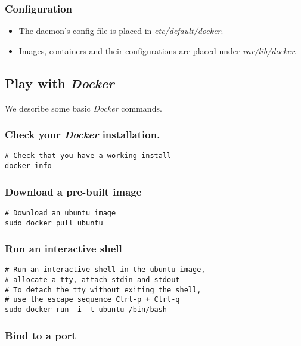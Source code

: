 \documentclass[11pt]{article}
\begin{document}
\subsubsection{Configuration}
\label{sec-2-2-5}

\begin{itemize}
\item The daemon's config file is placed in \emph{etc/default/docker}.
\item Images, containers and their configurations are placed under \emph{var/lib/docker}.
\end{itemize}
\subsection{Play with \emph{Docker}}
\label{sec-2-3}

We describe some basic \emph{Docker} commands.
\subsubsection{Check your \emph{Docker} installation.}
\label{sec-2-3-1}


\begin{verbatim}
# Check that you have a working install
docker info
\end{verbatim}
\subsubsection{Download a pre-built image}
\label{sec-2-3-2}


\begin{verbatim}
# Download an ubuntu image
sudo docker pull ubuntu
\end{verbatim}
\subsubsection{Run an interactive shell}
\label{sec-2-3-3}


\begin{verbatim}
# Run an interactive shell in the ubuntu image,
# allocate a tty, attach stdin and stdout
# To detach the tty without exiting the shell,
# use the escape sequence Ctrl-p + Ctrl-q
sudo docker run -i -t ubuntu /bin/bash
\end{verbatim}
\subsubsection{Bind to a port}
\label{sec-2-3-4}
\end{document}
